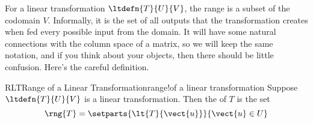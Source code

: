 %
%
For a linear transformation $\ltdefn{T}{U}{V}$, the range is a subset of the codomain $V$.  Informally, it is the set of all outputs that the transformation creates when fed every possible input from the domain.  It will have some natural connections with the column space of a matrix, so we will keep the same notation, and if you think about your objects, then there should be little confusion.  Here's the careful definition.
%
\begin{definition}{RLT}{Range of a Linear Transformation}{range!of a linear transformation}
Suppose $\ltdefn{T}{U}{V}$ is a linear transformation.  Then the  of $T$ is the set
%
\begin{equation*}
\rng{T}=\setparts{\lt{T}{\vect{u}}}{\vect{u}\in U}
\end{equation*}
%
\end{definition}
%
